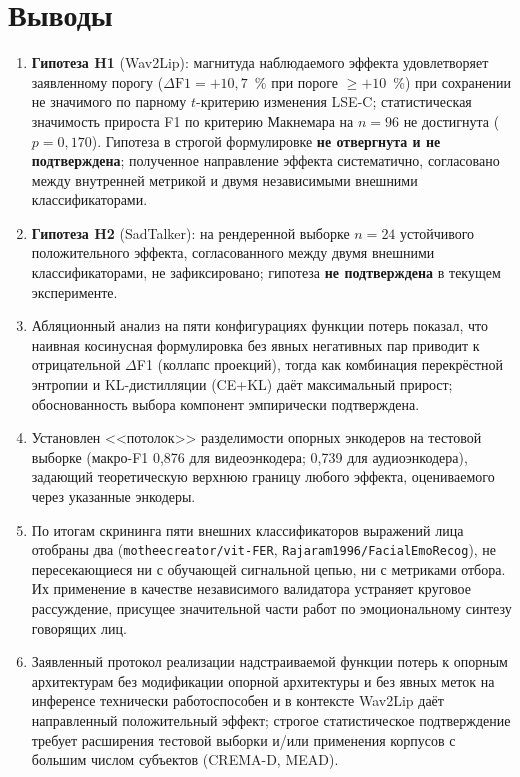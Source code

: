 \documentclass[a4paper, 12pt, oneside, openany]{article}
\begin{document}
\section{Выводы}

\begin{enumerate}
\item \textbf{Гипотеза H1} (Wav2Lip): магнитуда наблюдаемого эффекта удовлетворяет заявленному порогу ($\Delta\text{F1} = +10{,}7$~\% при пороге $\geq +10$~\%) при сохранении не значимого по парному $t$-критерию изменения LSE-C; статистическая значимость прироста F1 по критерию Макнемара на $n=96$ не достигнута ($p = 0{,}170$). Гипотеза в строгой формулировке \textbf{не отвергнута и не подтверждена}; полученное направление эффекта систематично, согласовано между внутренней метрикой и двумя независимыми внешними классификаторами.
\item \textbf{Гипотеза H2} (SadTalker): на рендеренной выборке $n=24$ устойчивого положительного эффекта, согласованного между двумя внешними классификаторами, не зафиксировано; гипотеза \textbf{не подтверждена} в текущем эксперименте.
\item Абляционный анализ на пяти конфигурациях функции потерь показал, что наивная косинусная формулировка без явных негативных пар приводит к отрицательной $\Delta$F1 (коллапс проекций), тогда как комбинация перекрёстной энтропии и KL-дистилляции (CE+KL) даёт максимальный прирост; обоснованность выбора компонент эмпирически подтверждена.
\item Установлен <<потолок>> разделимости опорных энкодеров на тестовой выборке (макро-F1 0,876 для видеоэнкодера; 0,739 для аудиоэнкодера), задающий теоретическую верхнюю границу любого эффекта, оцениваемого через указанные энкодеры.
\item По итогам скрининга пяти внешних классификаторов выражений лица отобраны два (\texttt{motheecreator/vit-FER}, \texttt{Rajaram1996/FacialEmoRecog}), не пересекающиеся ни с обучающей сигнальной цепью, ни с метриками отбора. Их применение в качестве независимого валидатора устраняет круговое рассуждение, присущее значительной части работ по эмоциональному синтезу говорящих лиц.
\item Заявленный протокол реализации надстраиваемой функции потерь к опорным архитектурам без модификации опорной архитектуры и без явных меток на инференсе технически работоспособен и в контексте Wav2Lip даёт направленный положительный эффект; строгое статистическое подтверждение требует расширения тестовой выборки и/или применения корпусов с большим числом субъектов (CREMA-D, MEAD).
\end{enumerate}
\end{document}
